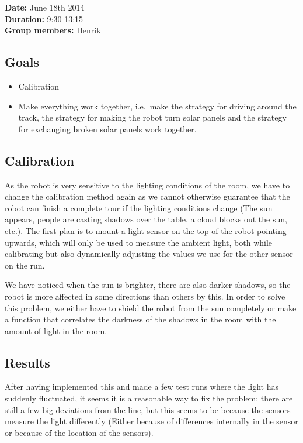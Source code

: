 \textbf{Date:} June 18th 2014\\\textbf{Duration:}
9:30-13:15\\\textbf{Group members:} Henrik

\subsection{Goals}

\begin{itemize}
\itemsep1pt\parskip0pt
\item
  Calibration
\item
  Make everything work together, i.e.~make the strategy for driving
  around the track, the strategy for making the robot turn solar panels
  and the strategy for exchanging broken solar panels work together.
\end{itemize}

\subsection{Calibration}

As the robot is very sensitive to the lighting conditions of the room,
we have to change the calibration method again as we cannot otherwise
guarantee that the robot can finish a complete tour if the lighting
conditions change (The sun appears, people are casting shadows over the
table, a cloud blocks out the sun, etc.). The first plan is to mount a
light sensor on the top of the robot pointing upwards, which will only
be used to measure the ambient light, both while calibrating but also
dynamically adjusting the values we use for the other sensor on the run.

We have noticed when the sun is brighter, there are also darker shadows,
so the robot is more affected in some directions than others by this. In
order to solve this problem, we either have to shield the robot from the
sun completely or make a function that correlates the darkness of the
shadows in the room with the amount of light in the room.

\subsection{Results}

After having implemented this and made a few test runs where the light
has suddenly fluctuated, it seems it is a reasonable way to fix the
problem; there are still a few big deviations from the line, but this
seems to be because the sensors measure the light differently (Either
because of differences internally in the sensor or because of the
location of the sensors).

